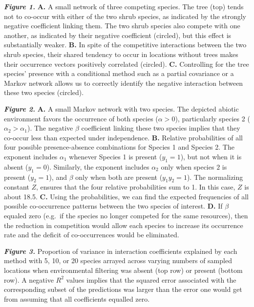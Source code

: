 \documentclass[12pt,]{article}
\begin{document}
\begin{spacing}{1.9}
\begin{flushleft}
\textbf{\emph{Figure 1.}} \textbf{A.} A small network of three competing
species. The tree (top) tends not to co-occur with either of the two
shrub species, as indicated by the strongly negative coefficient linking
them. The two shrub species also compete with one another, as indicated
by their negative coefficient (circled), but this effect is
substantially weaker. \textbf{B.} In spite of the competitive
interactions between the two shrub species, their shared tendency to
occur in locations without trees makes their occurrence vectors
positively correlated (circled). \textbf{C.} Controlling for the tree
species' presence with a conditional method such as a partial covariance
or a Markov network allows us to correctly identify the negative
interaction between these two species (circled).

\textbf{\emph{Figure 2.}} \textbf{A.} A small Markov network with two
species. The depicted abiotic environment favors the occurrence of both
species (\(\alpha >0\)), particularly species 2
(\(\alpha_2 > \alpha_1\)). The negative \(\beta\) coefficient linking
these two species implies that they co-occur less than expected under
independence. \textbf{B.} Relative probabilities of all four possible
presence-absence combinations for Species 1 and Species 2. The exponent
includes \(\alpha_1\) whenever Species 1 is present (\(y_1 = 1\)), but
not when it is absent (\(y_1 = 0\)). Similarly, the exponent includes
\(\alpha_2\) only when species \(2\) is present (\(y_2 = 1\)), and
\(\beta\) only when both are present (\(y_1y_2 = 1\)). The normalizing
constant \(Z\), ensures that the four relative probabilities sum to 1.
In this case, \(Z\) is about 18.5. \textbf{C.} Using the probabilities,
we can find the expected frequencies of all possible co-occurrence
patterns between the two species of interest. \textbf{D.} If \(\beta\)
equaled zero (e.g.~if the species no longer competed for the same
resources), then the reduction in competition would allow each species
to increase its occurrence rate and the deficit of co-occurrences would
be eliminated.

\textbf{\emph{Figure 3.}} Proportion of variance in interaction
coefficients explained by each method with 5, 10, or 20 species arrayed
across varying numbers of sampled locations when environmental filtering
was absent (top row) or present (bottom row). A negative \(R^2\) values
implies that the squared error associated with the corresponding subset
of the predictions was larger than the error one would get from assuming
that all coefficients equalled zero.


\end{flushleft}
\end{spacing}
\end{document}
